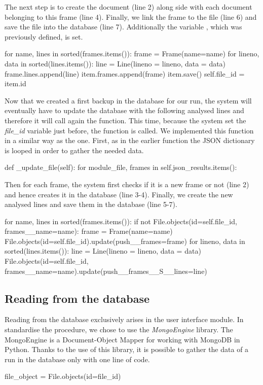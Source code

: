The next step is to create the  document (line 2) along side with each  document belonging to this frame (line 4). Finally, we link the frame to the file (line 6) and save the file into the database (line 7). Additionally the variable , which was previously defined, is set.
\begin{python}
for name, lines in sorted(frames.items()):
    frame = Frame(name=name)
    for lineno, data in sorted(lines.items()):
        line = Line(lineno = lineno, data = data)
        frame.lines.append(line)
    item.frames.append(frame)
    item.save()
self.file_id = item.id
\end{python}

Now that we created a first backup in the database for our run, the system will eventually have to update the database with the following analysed lines and therefore it will call again the  function. This time, because the system set the \textit{file\_id} variable just before, the  function is called. We implemented this function in a similar way as the  one. First, as in the earlier function the JSON dictionary is looped in order to gather the needed data.
\begin{python}
def _update_file(self):
  for module_file, frames in self.json_results.items():
\end{python}

Then for each frame, the system first checks if it is a new frame or not (line 2) and hence creates it in the database (line 3-4). Finally, we create the new analysed lines and save them in the database (line 5-7).
\begin{python}
for name, lines in sorted(frames.items()):
    if not File.objects(id=self.file_id, frames__name=name):
        frame = Frame(name=name)
        File.objects(id=self.file_id).update(push__frames=frame)
    for lineno, data in sorted(lines.items()):
        line = Line(lineno = lineno, data = data)
        File.objects(id=self.file_id, frames__name=name).update(push__frames__S__lines=line)
\end{python}

\subsection{Reading from the database}

Reading from the database exclusively arises in the user interface module. In standardise the procedure, we chose to use the \textit{MongoEngine} library. The MongoEngine is a Document-Object Mapper for working with MongoDB in Python. Thanks to the use of this library, it is possible to gather the data of a run in the database only with one line of code.
\begin{python}
file_object = File.objects(id=file_id)
\end{python} 

